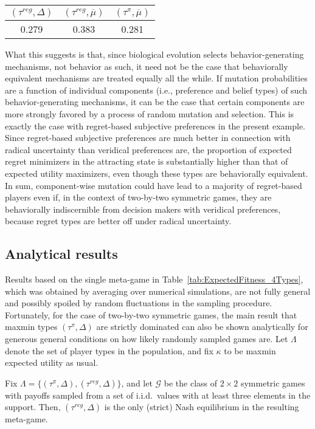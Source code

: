 \documentclass[fleqn,reqno,11pt]{article}
\begin{document}
\begin{center}
  \begin{tabular}{ccc}
    $(\tau^{reg}, \Delta)$ & $(\tau^{reg},
      \overline{\mu})$ & $(\tau^{\pi}, \overline{\mu})$ \\ \hline
    0.279  &   0.383 &    0.281 
  \end{tabular}
\end{center}

What this suggests is that, since biological evolution selects behavior-generating mechanisms,
not behavior as such, it need not be the case that behaviorally equivalent mechanisms are
treated equally all the while. If mutation probabilities are a function of individual
components (i.e., preference and belief types) of such behavior-generating mechanisms, it can be the case that certain components
are more strongly favored by a process of random mutation and selection. This is exactly the
case with regret-based subjective preferences in the present example. Since regret-based
subjective preferences are much better in connection with radical uncertainty than veridical
preferences are, the proportion of expected regret minimizers in the attracting state is
substantially higher than that of expected utility maximizers, even though these types are
behaviorally equivalent. In sum, component-wise mutation could have lead to a majority of
regret-based players even if, in the context of two-by-two symmetric games, they are behaviorally indiscernible from decision makers with
veridical preferences, because regret types are better off under radical uncertainty.

\subsection{Analytical results}
\label{sec:analytical-results}

Results based on the single meta-game in Table~\ref{tab:ExpectedFitness_4Types}, which was
obtained by averaging over numerical simulations, are not fully general and possibly spoiled by
random fluctuations in the sampling procedure. Fortunately, for the case of two-by-two symmetric games, the main result that maxmin types $(\tau^{\pi}, \Delta)$ are
strictly dominated can also be shown analytically for generous general conditions on how likely
randomly sampled games are. Let $\Lambda$ denote the set of player types in the population, and fix $\kappa$ to be maxmin expected utility as usual. 

\begin{proposition} \label{proposition1}

 Fix $\Lambda = \lbrace (\tau^{\pi}, \Delta), (\tau^{reg}, \Delta) \rbrace$, and let $\mathcal{G}$ be the class
  of $2 \times 2$ symmetric games with payoffs sampled from a
  set of i.i.d.~values with at least three elements in the support. Then, $(\tau^{reg}, \Delta)$ is the only (strict) Nash
  equilibrium in the resulting meta-game.

\end{proposition}
\end{document}
